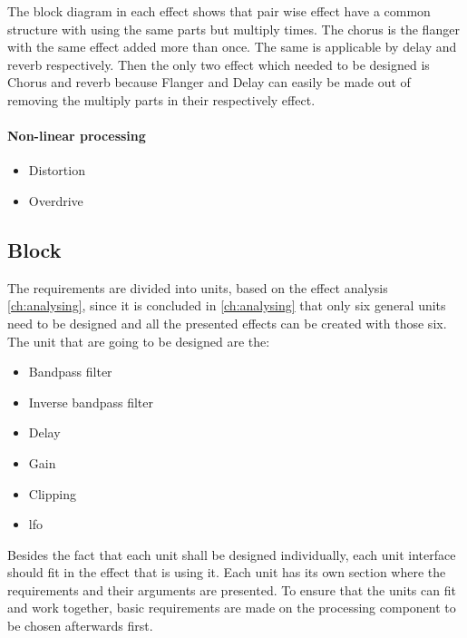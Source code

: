 The block diagram in each effect shows that pair wise effect have a common structure with using the same parts but multiply times. The chorus is the flanger with the same effect added more than once. The same is applicable by delay and \gls{reverb} respectively. Then the only two effect which needed to be designed is Chorus and \gls{reverb} because Flanger and Delay can easily be made out of removing the multiply parts in their respectively effect.

\paragraph{Non-linear processing}
\begin{itemize}
	\item Distortion
	\item Overdrive
\end{itemize} 

\subsection{Block}

The requirements are divided into units, based on the effect analysis \autoref{ch:analysing}, since it is concluded in \autoref{ch:analysing} that only six general units need to be designed and all the presented effects can be created with those six. The unit that are going to be designed are the:



\begin{itemize}
	\item Bandpass filter
	\item Inverse bandpass filter
	\item Delay
	\item Gain
	\item Clipping
	\item \gls{lfo}
\end{itemize} 

 Besides the fact that each unit shall be designed individually, each unit interface should fit in the effect that is using it. Each unit has its own section where the requirements and their arguments are presented. To ensure that the units can fit and work together, basic requirements  are made on the processing component to be chosen afterwards first.
 
 
